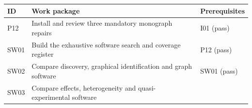 \documentclass[
  11pt,
  a4paper,
]{article}
\begin{document}
\begin{longtable}[]{@{}lll@{}}
\toprule
\begin{minipage}[b]{0.30\columnwidth}\raggedright
ID\strut
\end{minipage} & \begin{minipage}[b]{0.30\columnwidth}\raggedright
Work package\strut
\end{minipage} & \begin{minipage}[b]{0.30\columnwidth}\raggedright
Prerequisites\strut
\end{minipage}\tabularnewline
\midrule
\endhead
\begin{minipage}[t]{0.30\columnwidth}\raggedright
P12\strut
\end{minipage} & \begin{minipage}[t]{0.30\columnwidth}\raggedright
Install and review three mandatory monograph repairs\strut
\end{minipage} & \begin{minipage}[t]{0.30\columnwidth}\raggedright
I01 (pass)\strut
\end{minipage}\tabularnewline
\begin{minipage}[t]{0.30\columnwidth}\raggedright
SW01\strut
\end{minipage} & \begin{minipage}[t]{0.30\columnwidth}\raggedright
Build the exhaustive software search and coverage register\strut
\end{minipage} & \begin{minipage}[t]{0.30\columnwidth}\raggedright
P12 (pass)\strut
\end{minipage}\tabularnewline
\begin{minipage}[t]{0.30\columnwidth}\raggedright
SW02\strut
\end{minipage} & \begin{minipage}[t]{0.30\columnwidth}\raggedright
Compare discovery, graphical identification and graph software\strut
\end{minipage} & \begin{minipage}[t]{0.30\columnwidth}\raggedright
SW01 (pass)\strut
\end{minipage}\tabularnewline
\begin{minipage}[t]{0.30\columnwidth}\raggedright
SW03\strut
\end{minipage} & \begin{minipage}[t]{0.30\columnwidth}\raggedright
Compare effects, heterogeneity and quasi-experimental software\strut
\end{minipage} & \begin{minipage}[t]{0.30\columnwidth}\raggedright

\end{minipage}
\end{longtable}
\end{document}
